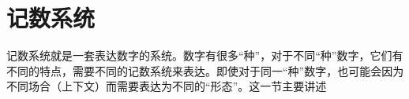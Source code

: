 \documentclass[../build/book.tex]{subfiles}
\begin{document}
\section{记数系统}

记数系统就是一套表达数字的系统。数字有很多“种”，对于不同“种”数字，它们有不同的特点，需要不同的记数系统来表达。即使对于同一“种”数字，也可能会因为不同场合（上下文）而需要表达为不同的“形态”。这一节主要讲述
\end{document}
